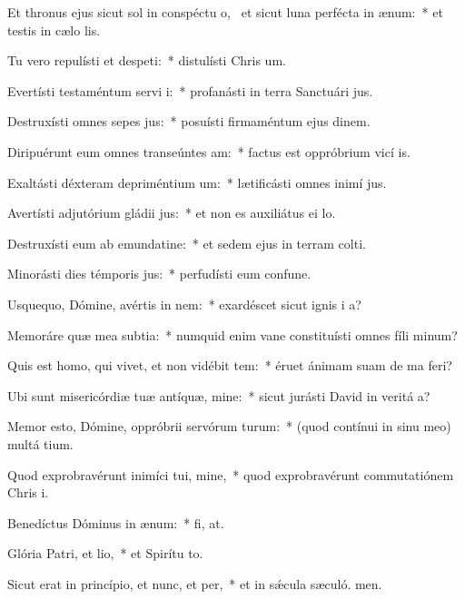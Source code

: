 \item Et thronus ejus sicut sol in conspéctu o,~\pscross{} et sicut luna perfécta in ænum:~* et testis in cælo lis.
\item Tu vero repulísti et despeti:~* distulísti Chris um.
\item Evertísti testaméntum servi i:~* profanásti in terra Sanctuári jus.
\item Destruxísti omnes sepes jus:~* posuísti firmaméntum ejus dinem.
\item Diripuérunt eum omnes transeúntes am:~* factus est oppróbrium vicí is.
\item Exaltásti déxteram depriméntium um:~* lætificásti omnes inimí jus.
\item Avertísti adjutórium gládii jus:~* et non es auxiliátus ei  lo.
\item Destruxísti eum ab emundatine:~* et sedem ejus in terram colti.
\item Minorásti dies témporis jus:~* perfudísti eum confune.
\item Usquequo, Dómine, avértis in nem:~* exardéscet sicut ignis i a?
\item Memoráre quæ mea subtia:~* numquid enim vane constituísti omnes fíli minum?
\item Quis est homo, qui vivet, et non vidébit tem:~* éruet ánimam suam de ma feri?
\item Ubi sunt misericórdiæ tuæ antíquæ, mine:~* sicut jurásti David in veritá a?
\item Memor esto, Dómine, oppróbrii servórum turum:~* (quod contínui in sinu meo) multá tium.
\item Quod exprobravérunt inimíci tui, mine,~* quod exprobravérunt commutatiónem Chris i.
\item Benedíctus Dóminus in ænum:~* fi, at.
\item Glória Patri, et lio,~* et Spirítu to.
\item Sicut erat in princípio, et nunc, et per,~* et in sǽcula sæculó. men.
